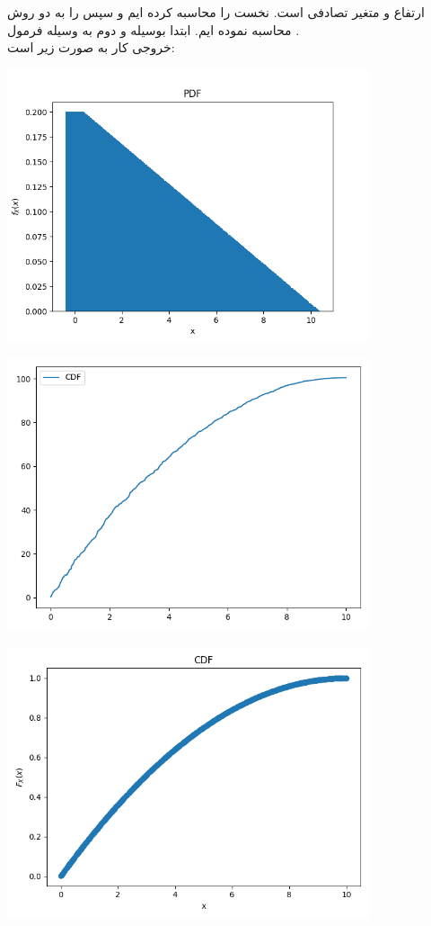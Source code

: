 \documentclass[a4paper,14pt]{article}
\begin{document}
 ارتفاع  و  متغیر تصادفی است. نخست  را محاسبه کرده ایم و سپس  را به دو روش محاسبه نموده ایم.
ابتدا بوسیله  و دوم به وسیله فرمول .\\

خروجی کار به صورت زیر است:\\

\begin{center}
	\includegraphics[width=0.8\textwidth]{pic7.png}
\end{center}

\begin{center}
	\includegraphics[width=0.8\textwidth]{pic8.png}
\end{center}

\begin{center}
	\includegraphics[width=0.8\textwidth]{pic9.png}
\end{center}
\end{document}

